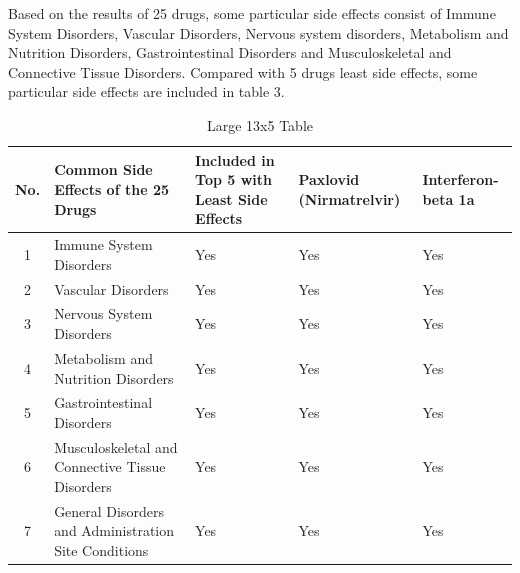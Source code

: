 \documentclass[conference]{IEEEtran}
\begin{document}
Based on the results of 25 drugs, some particular side effects consist of Immune System Disorders, Vascular Disorders, Nervous system disorders, Metabolism and Nutrition Disorders, Gastrointestinal Disorders and Musculoskeletal and Connective Tissue Disorders. Compared with 5 drugs least side effects, some particular side effects are included in table 3.\\

\begin{table}[h!]
  \centering
  \caption{Large 13x5 Table}
  \label{tab:large_table}
  \begin{tabular}{
    |c|>{\raggedright\arraybackslash}p{2.2cm}|
    >{\centering\arraybackslash}p{1.5cm}|
    >{\centering\arraybackslash}p{1.2cm}|
    >{\centering\arraybackslash}p{1.2cm}|}
    \hline
    \textbf{No.} & \textbf{Common Side Effects of the 25 Drugs}         & \textbf{Included in Top 5 with Least Side Effects} & \textbf{Paxlovid (Nirmatrelvir)} & \textbf{Interferon-beta 1a} \\ \hline
    1            & Immune System Disorders                              & Yes                                                & Yes                              & Yes                         \\ \hline
    2            & Vascular Disorders                                   & Yes                                                & Yes                              & Yes                         \\ \hline
    3            & Nervous System Disorders                             & Yes                                                & Yes                              & Yes                         \\ \hline
    4            & Metabolism and Nutrition Disorders                   & Yes                                                & Yes                              & Yes                         \\ \hline
    5            & Gastrointestinal Disorders                           & Yes                                                & Yes                              & Yes                         \\ \hline
    6            & Musculoskeletal and Connective Tissue Disorders      & Yes                                                & Yes                              & Yes                         \\ \hline
    7            & General Disorders and Administration Site Conditions & Yes                                                & Yes                              & Yes                         \\ \hline

\end{tabular}
\end{table}
\end{document}
